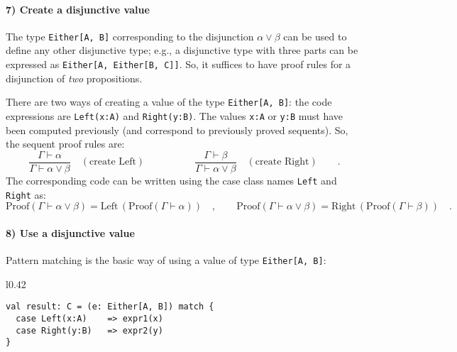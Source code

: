 \paragraph{7) Create a disjunctive value}

The type \lstinline!Either[A, B]! corresponding to the disjunction
$\alpha\vee\beta$ can be used to define any other disjunctive type;
e.g., a disjunctive type with three parts can be expressed as \lstinline!Either[A, Either[B, C]]!.
So, it suffices to have proof rules for a disjunction of \emph{two}
propositions.

There are two ways of creating a value of the type \lstinline!Either[A, B]!:
the code expressions are \lstinline!Left(x:A)! and \lstinline!Right(y:B)!.
The values \lstinline!x:A! or \lstinline!y:B! must have been computed
previously (and correspond to previously proved sequents). So, the
sequent proof rules are:
\[
\frac{\Gamma\vdash\alpha}{\Gamma\vdash\alpha\vee\beta}\quad(\text{create Left})\quad\quad\quad\quad\quad\frac{\Gamma\vdash\beta}{\Gamma\vdash\alpha\vee\beta}\quad(\text{create Right})\quad\quad.
\]
The corresponding code can be written using the case class names \lstinline!Left!
and \lstinline!Right! as:
\[
\text{Proof}\left(\Gamma\vdash\alpha\vee\beta\right)=\text{Left}\,(\text{Proof}\left(\Gamma\vdash\alpha\right))\quad,\quad\quad\text{Proof}\left(\Gamma\vdash\alpha\vee\beta\right)=\text{Right}\,(\text{Proof}\left(\Gamma\vdash\beta\right))\quad.
\]


\paragraph{8) Use a disjunctive value}

Pattern matching is the basic way of using a value of type \lstinline!Either[A, B]!:

\begin{wrapfigure}{l}{0.42\columnwidth}%
\vspace{-1\baselineskip}
\begin{lstlisting}
val result: C = (e: Either[A, B]) match {
  case Left(x:A)    => expr1(x)
  case Right(y:B)   => expr2(y)
}
\end{lstlisting}

\vspace{-1.2\baselineskip}
\end{wrapfigure}%

